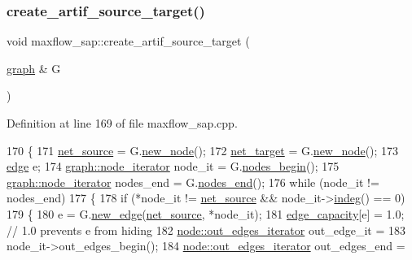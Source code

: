 \subsubsection{\texorpdfstring{create\+\_\+artif\+\_\+source\+\_\+target()}{create\_artif\_source\_target()}}
{\footnotesize\ttfamily void maxflow\+\_\+sap\+::create\+\_\+artif\+\_\+source\+\_\+target (\begin{DoxyParamCaption}\item[{\mbox{\hyperlink{classgraph}{graph}} \&}]{G }\end{DoxyParamCaption})\hspace{0.3cm}{\ttfamily [protected]}}



Definition at line 169 of file maxflow\+\_\+sap.\+cpp.


\begin{DoxyCode}
170 \{
171     \mbox{\hyperlink{classmaxflow__sap_abd4266c76dbd73f7f719d3a4fba2655d}{net\_source}} = G.\mbox{\hyperlink{classgraph_ab9505335c20558319b6cce25aed23524}{new\_node}}();
172     \mbox{\hyperlink{classmaxflow__sap_a8d0e8f448ed29a1329a70c8f4f496c2c}{net\_target}} = G.\mbox{\hyperlink{classgraph_ab9505335c20558319b6cce25aed23524}{new\_node}}();
173     \mbox{\hyperlink{classedge}{edge}} e;
174     \mbox{\hyperlink{classgraph_a2cb374b84c133ce13f94e73c3e5da7fa}{graph::node\_iterator}} node\_it = G.\mbox{\hyperlink{classgraph_aec053a4b509d1be804237a80044c54c0}{nodes\_begin}}();
175     \mbox{\hyperlink{classgraph_a2cb374b84c133ce13f94e73c3e5da7fa}{graph::node\_iterator}} nodes\_end = G.\mbox{\hyperlink{classgraph_abbf9c0cb5629e98e1142254911238173}{nodes\_end}}();
176     \textcolor{keywordflow}{while} (node\_it != nodes\_end)
177     \{
178         \textcolor{keywordflow}{if} (*node\_it != \mbox{\hyperlink{classmaxflow__sap_abd4266c76dbd73f7f719d3a4fba2655d}{net\_source}} && node\_it->\mbox{\hyperlink{classnode_a749bfd1316584b96f8c9b0e44ad512f0}{indeg}}() == 0)
179         \{
180             e = G.\mbox{\hyperlink{classgraph_a02a0c3a219f75d68caa408ef339d4a1c}{new\_edge}}(\mbox{\hyperlink{classmaxflow__sap_abd4266c76dbd73f7f719d3a4fba2655d}{net\_source}}, *node\_it);
181             \mbox{\hyperlink{classmaxflow__sap_acfa95eef5ea5bf7814c4dabd3994bc63}{edge\_capacity}}[e] = 1.0;    \textcolor{comment}{// 1.0 prevents e from hiding}
182             \mbox{\hyperlink{classnode_a90e17ed34de55072e8077f4367499a98}{node::out\_edges\_iterator}} out\_edge\_it =
183                 node\_it->out\_edges\_begin();
184             \mbox{\hyperlink{classnode_a90e17ed34de55072e8077f4367499a98}{node::out\_edges\_iterator}} out\_edges\_end =

\end{DoxyCode}
